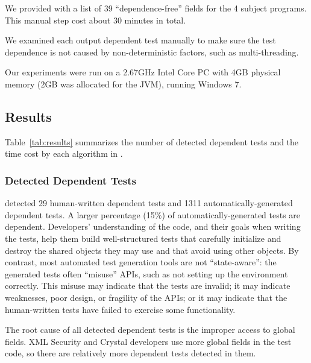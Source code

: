 We provided \ourtool with a list of 39 ``dependence-free'' fields
for the 4 subject programs. This manual step cost
about 30 minutes in total.


We examined each output dependent test manually to make
sure the test dependence is not caused by non-deterministic
factors, such as multi-threading.

Our experiments were run on a 2.67GHz Intel Core PC
with 4GB physical memory (2GB was allocated for the JVM),
running Windows 7.

\subsection{Results}

Table~\ref{tab:results} summarizes the number of detected
dependent tests and the time cost by each algorithm
in \ourtool.

\subsubsection{Detected Dependent Tests}
\label{sec:detectedtests}


\ourtool detected 29 human-written dependent tests and 1311
automatically-generated dependent tests.  A larger percentage (15\%) of
automatically-generated tests are dependent.  Developers' understanding of
the code, and their goals when writing the tests, help them build
well-structured tests that carefully initialize and destroy the shared
objects they may use and that avoid using other objects.
By contrast,  most automated test generation tools are not ``state-aware'': the
generated tests often ``misuse'' APIs, such as not setting up
the environment correctly.  This misuse may
indicate that the tests are invalid; it may indicate weaknesses, poor
design, or fragility of the APIs; or it may indicate that the human-written
tests have failed to exercise some functionality.

The root cause of all detected dependent tests is the improper access to
global fields. XML Security and Crystal developers use more
global fields in the test code,
so there are relatively more dependent tests detected in them.

